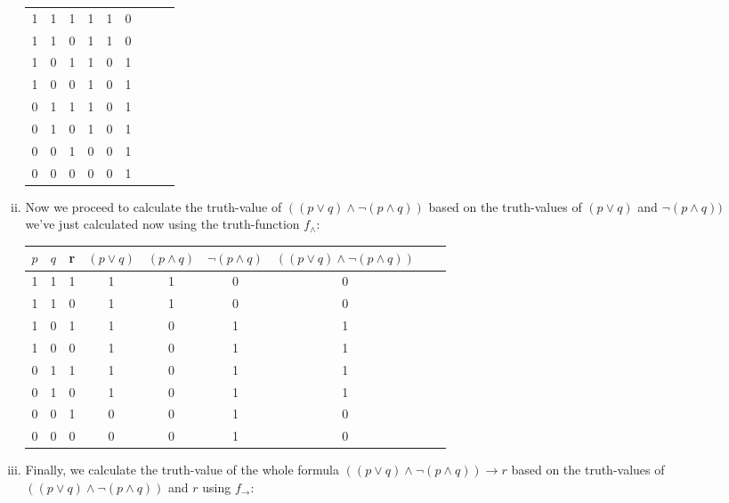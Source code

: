\begin{enumerate}[\thesection.1]
\begin{enumerate}
\begin{enumerate}[(i)]
\begin{center}
\begin{tabular}{c c c | c | c | c | c  c  c}
1 & 1 & 1 & 1 &1&0& \\

1 & 1 & 0 & 1 &1&0&  \\

1 & 0 & 1 & 1 &0&1& \\

1 & 0 & 0  & 1 &0& 1\\

0 & 1 &  1 & 1 &0& 1\\

0 & 1 & 0 & 1 &0&1 \\

0 & 0 & 1 & 0 &0& 1 \\

0 & 0 & 0 & 0 &0&1

\end{tabular}

\end{center}

\item Now we proceed to calculate the truth-value of $((p\lor q)\land \neg(p\land q))$ based on the truth-values of $(p\lor q)$ and $\neg(p\land q))$ we've just calculated now using the truth-function $f_\land$:

\begin{center}
\begin{tabular}{c c c | c | c | c | c | c  c}
$p$ & $q$  & r & $(p\lor q)$ & $(p\land q)$ &  $\neg (p\land q)$ & $((p\lor q)\land \neg(p\land q))$ &\hspace*{2ex} \\\hline

1 & 1 & 1 & 1 &1&0&  0\\

1 & 1 & 0 & 1 &1&0&  0\\

1 & 0 & 1 & 1 &0&1& 1\\

1 & 0 & 0  & 1 &0& 1&1\\

0 & 1 &  1 & 1 &0& 1 &1 \\

0 & 1 & 0 & 1 &0&1& 1 \\

0 & 0 & 1 & 0 &0& 1 &0\\

0 & 0 & 0 & 0 &0&1 &0

\end{tabular}

\end{center}

\item Finally, we calculate the truth-value of the whole formula $((p\lor q)\land \neg(p\land q))\to r$ based on the truth-values of $((p\lor q)\land \neg(p\land q))$ and $r$ using $f_\to$:

\end{enumerate}

\end{enumerate}


	\end{enumerate}

